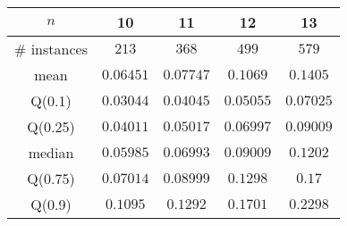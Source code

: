 \begin{tabular}{c|cccc} 
\hline 
$n$ & 10 & 11 & 12 & 13 \tabularnewline 
\hline 
\hline 
\# instances & $213$ & $368$ & $499$ & $579$ \tabularnewline 
mean & $0.06451$ & $0.07747$ & $0.1069$ & $0.1405$ \tabularnewline 
Q(0.1) & $0.03044$ & $0.04045$ & $0.05055$ & $0.07025$ \tabularnewline 
Q(0.25) & $0.04011$ & $0.05017$ & $0.06997$ & $0.09009$ \tabularnewline 
median & $0.05985$ & $0.06993$ & $0.09009$ & $0.1202$ \tabularnewline 
Q(0.75) & $0.07014$ & $0.08999$ & $0.1298$ & $0.17$ \tabularnewline 
Q(0.9) & $0.1095$ & $0.1292$ & $0.1701$ & $0.2298$ \tabularnewline 
\hline 
\end{tabular} 
\medskip{} 

